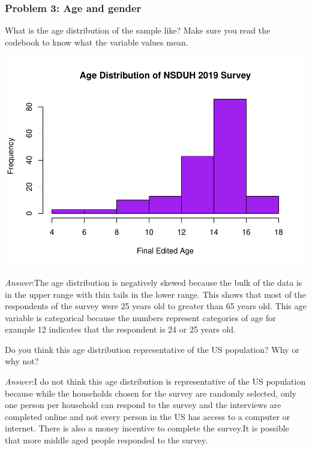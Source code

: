 \documentclass[
]{article}
\newenvironment{Shaded}{\begin{snugshade}}{\end{snugshade}}
\newcommand{\AttributeTok}[1]{\textcolor[rgb]{0.77,0.63,0.00}{#1}}
\newcommand{\FunctionTok}[1]{\textcolor[rgb]{0.00,0.00,0.00}{#1}}
\newcommand{\NormalTok}[1]{#1}
\newcommand{\SpecialCharTok}[1]{\textcolor[rgb]{0.00,0.00,0.00}{#1}}
\newcommand{\StringTok}[1]{\textcolor[rgb]{0.31,0.60,0.02}{#1}}
\begin{document}
\hypertarget{problem-3-age-and-gender}{%
\subsubsection{Problem 3: Age and
gender}\label{problem-3-age-and-gender}}

What is the age distribution of the sample like? Make sure you read the
codebook to know what the variable values mean.

\begin{Shaded}
\end{Shaded}

\includegraphics{Assignments_files/figure-latex/unnamed-chunk-10-1.pdf}

\emph{Answer}:The age distribution is negatively skewed because the bulk
of the data is in the upper range with thin tails in the lower range.
This shows that most of the respondents of the survey were 25 years old
to greater than 65 years old. This age variable is categorical because
the numbers represent categories of age for example 12 indicates that
the respondent is 24 or 25 years old.

Do you think this age distribution representative of the US population?
Why or why not?

\emph{Answer}:I do not think this age distribution is representative of
the US population because while the households chosen for the survey are
randomly selected, only one person per household can respond to the
survey and the interviews are completed online and not every person in
the US has access to a computer or internet. There is also a money
incentive to complete the survey.It is possible that more middle aged
people responded to the survey.
\end{document}
